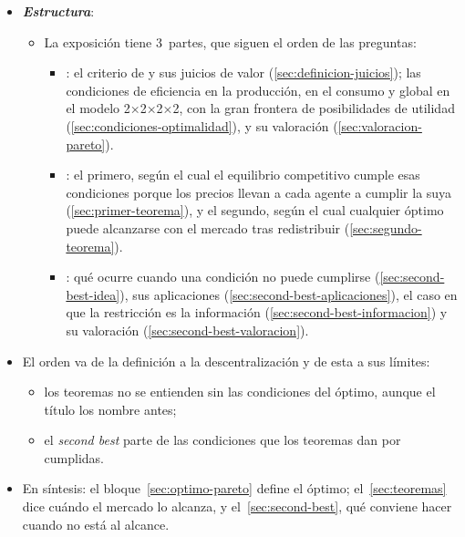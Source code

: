 \documentclass[11pt]{article}
\begin{document}
\begin{itemize}
\item \textbf{\emph{Estructura}}:
  \begin{itemize}
  \item La exposición tiene 3~partes, que siguen el orden de las preguntas:
  \begin{itemize}
  \item {}: el criterio de  y sus juicios de valor (\ref{sec:definicion-juicios}); las condiciones de eficiencia en la producción, en el consumo y global en el modelo 2×2×2×2, con la gran frontera de posibilidades de utilidad (\ref{sec:condiciones-optimalidad}), y su valoración (\ref{sec:valoracion-pareto}).
  \item {}: el primero, según el cual el equilibrio competitivo cumple esas condiciones porque los precios llevan a cada agente a cumplir la suya (\ref{sec:primer-teorema}), y el segundo, según el cual cualquier óptimo puede alcanzarse con el mercado tras redistribuir (\ref{sec:segundo-teorema}).
  \item {}: qué ocurre cuando una condición no puede cumplirse (\ref{sec:second-best-idea}), sus aplicaciones (\ref{sec:second-best-aplicaciones}), el caso en que la restricción es la información (\ref{sec:second-best-informacion}) y su valoración (\ref{sec:second-best-valoracion}).
  \end{itemize}
  \end{itemize}
\item El orden va de la definición a la descentralización y de esta a sus límites:
  \begin{itemize}
  \item los teoremas no se entienden sin las condiciones del óptimo, aunque el título los nombre antes;
  \item el \emph{second best} parte de las condiciones que los teoremas dan por cumplidas.
  \end{itemize}
\item En síntesis: el bloque~\ref{sec:optimo-pareto} define el óptimo; el~\ref{sec:teoremas} dice cuándo el mercado lo alcanza, y el~\ref{sec:second-best}, qué conviene hacer cuando no está al alcance.
\end{itemize}
\end{document}
